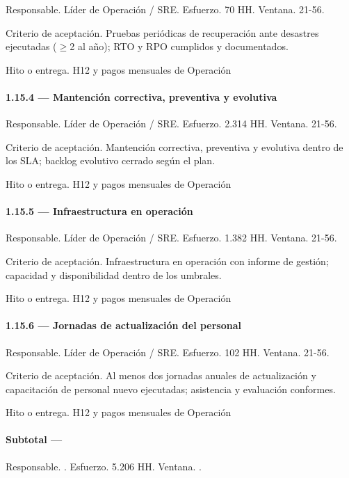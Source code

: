 \documentclass[11pt]{article}
\begin{document}
Responsable. Líder de Operación / SRE. Esfuerzo. 70 HH. Ventana. 21-56.

Criterio de aceptación. Pruebas periódicas de recuperación ante desastres ejecutadas (\(\geq\)2 al año); RTO y RPO cumplidos y documentados.

Hito o entrega. H12 y pagos mensuales de Operación

\paragraph{1.15.4 — Mantención correctiva, preventiva y evolutiva}

Responsable. Líder de Operación / SRE. Esfuerzo. 2.314 HH. Ventana. 21-56.

Criterio de aceptación. Mantención correctiva, preventiva y evolutiva dentro de los SLA; backlog evolutivo cerrado según el plan.

Hito o entrega. H12 y pagos mensuales de Operación

\paragraph{1.15.5 — Infraestructura en operación}

Responsable. Líder de Operación / SRE. Esfuerzo. 1.382 HH. Ventana. 21-56.

Criterio de aceptación. Infraestructura en operación con informe de gestión; capacidad y disponibilidad dentro de los umbrales.

Hito o entrega. H12 y pagos mensuales de Operación

\paragraph{1.15.6 — Jornadas de actualización del personal}

Responsable. Líder de Operación / SRE. Esfuerzo. 102 HH. Ventana. 21-56.

Criterio de aceptación. Al menos dos jornadas anuales de actualización y capacitación de personal nuevo ejecutadas; asistencia y evaluación conformes.

Hito o entrega. H12 y pagos mensuales de Operación

\paragraph{Subtotal — }

Responsable. . Esfuerzo. 5.206 HH. Ventana. .
\end{document}
